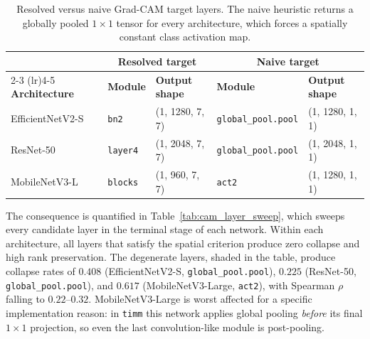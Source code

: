 \documentclass[fleqn,10pt]{wlscirep}
\begin{document}
\begin{table}[!ht]
\centering
\scriptsize
\caption{Resolved versus naive Grad-CAM target layers. The naive heuristic returns a globally pooled $1 \times 1$ tensor for every architecture, which forces a spatially constant class activation map.}
\label{tab:cam_layers}
\setlength{\tabcolsep}{4pt}
\begin{tabular}{lll ll}
\toprule
 & \multicolumn{2}{c}{\textbf{Resolved target}} & \multicolumn{2}{c}{\textbf{Naive target}} \\
\cmidrule(lr){2-3} \cmidrule(lr){4-5}
\textbf{Architecture} & \textbf{Module} & \textbf{Output shape} & \textbf{Module} & \textbf{Output shape} \\
\midrule
EfficientNetV2-S & \texttt{bn2} & (1, 1280, 7, 7) & \texttt{global\_pool.pool} & (1, 1280, 1, 1) \\
ResNet-50 & \texttt{layer4} & (1, 2048, 7, 7) & \texttt{global\_pool.pool} & (1, 2048, 1, 1) \\
MobileNetV3-L & \texttt{blocks} & (1, 960, 7, 7) & \texttt{act2} & (1, 1280, 1, 1) \\
\bottomrule
\end{tabular}
\end{table}

The consequence is quantified in Table~\ref{tab:cam_layer_sweep}, which sweeps every candidate layer in the terminal stage of each network. Within each architecture, all layers that satisfy the spatial criterion produce zero collapse and high rank preservation. The degenerate layers, shaded in the table, produce collapse rates of $0.408$ (EfficientNetV2-S, \texttt{global\_pool.pool}), $0.225$ (ResNet-50, \texttt{global\_pool.pool}), and $0.617$ (MobileNetV3-Large, \texttt{act2}), with Spearman $\rho$ falling to $0.22$--$0.32$. MobileNetV3-Large is worst affected for a specific implementation reason: in \texttt{timm} this network applies global pooling \emph{before} its final $1 \times 1$ projection, so even the last convolution-like module is post-pooling.
\end{document}
